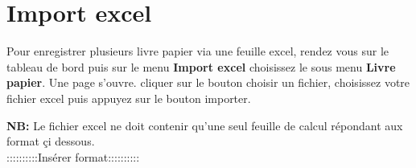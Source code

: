 \documentclass[12pt,a4paper]{article}
\begin{document}
\section{Import excel}
Pour enregistrer plusieurs livre papier via une feuille excel, rendez vous sur le
tableau de bord puis sur le menu \textbf{Import excel} choisissez le sous menu 
\textbf{Livre papier}. Une page s'ouvre. cliquer sur le bouton choisir un fichier,
choisissez votre fichier excel puis appuyez sur le bouton importer. 

\textbf{NB:} Le fichier excel ne doit contenir qu'une seul feuille de calcul répondant
aux format çi dessous.\\
::::::::::Insérer format::::::::::
\end{document}
